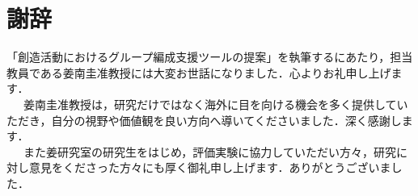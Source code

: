 \documentclass{funthesis}
\begin{document}
\chapter*{謝辞}
「創造活動におけるグループ編成支援ツールの提案」を執筆するにあたり，担当教員である姜南圭准教授には大変お世話になりました．心よりお礼申し上げます．\\
\ \ \ 姜南圭准教授は，研究だけではなく海外に目を向ける機会を多く提供していただき，自分の視野や価値観を良い方向へ導いてくださいました．深く感謝します．\\
\ \ \ また姜研究室の研究生をはじめ，評価実験に協力していただい方々，研究に対し意見をくださった方々にも厚く御礼申し上げます．ありがとうございました．




\end{document}
